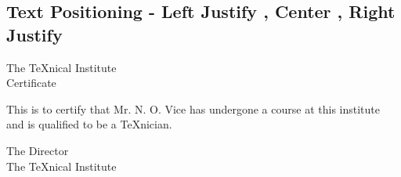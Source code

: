 \subsection{Text Positioning - Left Justify , Center , Right Justify }

\begin{center}
The \TeX nical Institute\\[.75cm]
Certificate
\end{center}
This is to certify that Mr. N. O. Vice has undergone a
course at this institute and is qualified to be a \TeX nician.
\begin{flushright}
The Director\\
The \TeX nical Institute
\end{flushright}


\subsection{ }


  